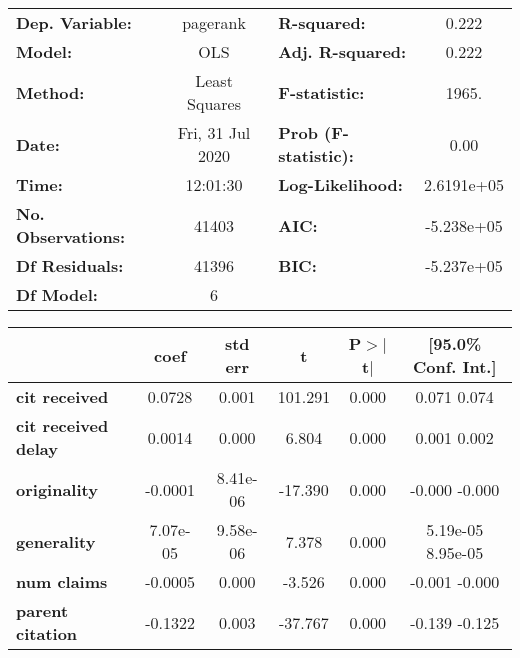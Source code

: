 \begin{center}
\begin{tabular}{lclc}
\toprule
\textbf{Dep. Variable:}     &     pagerank     & \textbf{  R-squared:         } &       0.222     \\
\textbf{Model:}             &       OLS        & \textbf{  Adj. R-squared:    } &       0.222     \\
\textbf{Method:}            &  Least Squares   & \textbf{  F-statistic:       } &       1965.     \\
\textbf{Date:}              & Fri, 31 Jul 2020 & \textbf{  Prob (F-statistic):} &       0.00      \\
\textbf{Time:}              &     12:01:30     & \textbf{  Log-Likelihood:    } &   2.6191e+05    \\
\textbf{No. Observations:}  &       41403      & \textbf{  AIC:               } &   -5.238e+05    \\
\textbf{Df Residuals:}      &       41396      & \textbf{  BIC:               } &   -5.237e+05    \\
\textbf{Df Model:}          &           6      & \textbf{                     } &                 \\
\bottomrule
\end{tabular}
\begin{tabular}{lccccc}
                            & \textbf{coef} & \textbf{std err} & \textbf{t} & \textbf{P$>$$|$t$|$} & \textbf{[95.0\% Conf. Int.]}  \\
\midrule
\textbf{cit received}       &       0.0728  &        0.001     &   101.291  &         0.000        &         0.071     0.074       \\
\textbf{cit received delay} &       0.0014  &        0.000     &     6.804  &         0.000        &         0.001     0.002       \\
\textbf{originality}        &      -0.0001  &     8.41e-06     &   -17.390  &         0.000        &        -0.000    -0.000       \\
\textbf{generality}         &     7.07e-05  &     9.58e-06     &     7.378  &         0.000        &      5.19e-05  8.95e-05       \\
\textbf{num claims}         &      -0.0005  &        0.000     &    -3.526  &         0.000        &        -0.001    -0.000       \\
\textbf{parent citation}    &      -0.1322  &        0.003     &   -37.767  &         0.000        &        -0.139    -0.125       \\

\end{tabular}
\end{center}
